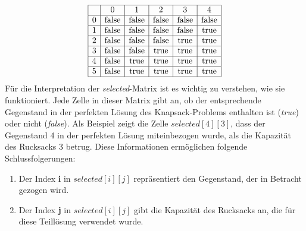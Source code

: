 \[
\begin{array}{|c|c|c|c|c|c|}
\hline
& 0 & 1 & 2 & 3 & 4 \\
\hline
0 & \text{false} & \text{false} & \text{false} & \text{false} & \text{false} \\
\hline
1 & \text{false} & \text{false} & \text{false} & \text{false} & \text{true} \\
\hline
2 & \text{false} & \text{false} & \text{false} & \text{true} & \text{true} \\
\hline
3 & \text{false} & \text{false} & \text{true} & \text{true} & \text{true} \\
\hline
4 & \text{false} & \text{true} & \text{true} & \text{true} & \text{true} \\
\hline
5 & \text{false} & \text{true} & \text{true} & \text{true} & \text{true} \\
\hline
\end{array}
\]
Für die Interpretation der \textit{selected}-Matrix ist es wichtig zu verstehen, wie sie funktioniert. Jede Zelle in dieser
Matrix gibt an, ob der entsprechende Gegenstand in der perfekten Lösung des Knapsack-Problems enthalten ist (\textit{true})
oder nicht (\textit{false}). Als Beispiel zeigt die Zelle $selected[4][3]$, dass der Gegenstand 4 in der perfekten Lösung
miteinbezogen wurde, als die Kapazität des Rucksacks 3 betrug. Diese Informationen ermöglichen folgende Schlussfolgerungen:
\begin{enumerate}
    \item Der Index \textbf{i} in $selected[i][j]$ repräsentiert den Gegenstand, der in Betracht gezogen wird.
    \item Der Index \textbf{j} in $selected[i][j]$ gibt die Kapazität des Rucksacks an, die für diese Teillösung verwendet
    wurde.
\end{enumerate}

